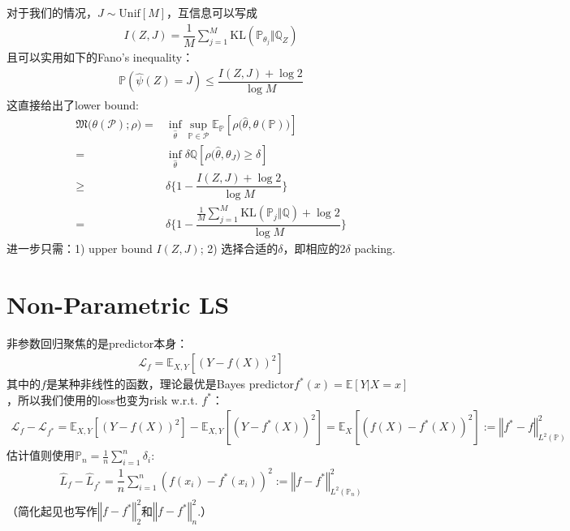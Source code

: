 \documentclass[11pt,a4paper]{ctexart}
\numberwithin{equation}{section}%
\begin{document}
对于我们的情况，$ J \sim \mathrm{ Unif }[M] $，互信息可以写成
\begin{align*}
    I(Z,J) = \dfrac{ 1 }{ M  } \sum_{j=1}^M \mathrm{ KL }\left( \mathbb{P}_{\theta _j}\Vert \mathbb{Q}_Z \right)
\end{align*}
且可以实用如下的Fano's inequality：
\begin{align*}
    \mathbb{P}\left( \hat{\psi}(Z) = J \right) \leq \dfrac{ I(Z,J)+ \log 2 }{ \log M }   
\end{align*}
这直接给出了lower bound:
\begin{align*}
    \mathfrak{M}\big(\theta (\mathcal{P});\rho \big)  = & \mathop{ \inf  }\limits_{\hat{\theta }} \mathop{ \sup  }\limits_{\mathbb{P}\in \mathcal{P}} \mathbb{E}_\mathbb{P}\left[ \rho \bigl(\hat{\theta }, \theta (\mathbb{P})\bigr) \right]   \\
    =& \mathop{ \inf  }\limits_{\hat{\theta }} \delta \mathbb{Q}[ \rho \bigl(\hat{\theta }, \theta_J \bigr) \geq \delta  ]\\
    \geq &\delta \big\{ 1-\dfrac{ I(Z,J)+ \log 2 }{ \log M }     \big\}\\
    =& \delta \big\{ 1-\dfrac{ \frac{1}{M} \sum_{j=1}^M \mathrm{ KL }(\mathbb{P}_j \Vert \mathbb{Q})  + \log 2 }{ \log M }     \big\}
\end{align*}
进一步只需：1) upper bound $ I(Z,J) $; 2) 选择合适的$ \delta  $，即相应的$ 2\delta  $ packing.








\section{Non-Parametric LS}
非参数回归聚焦的是predictor本身：
\begin{align*}
    \mathcal{L}_f= \mathbb{E}_{X,Y}\left[ (Y-f(X))^2 \right]  
\end{align*}
其中的$ f $是某种非线性的函数，理论最优是Bayes predictor$ f^*(x)=\mathbb{E}\left[ Y|X=x \right]  $，所以我们使用的loss也变为risk w.r.t. $ f^* $：
\begin{align*}
     \mathcal{L}_f-\mathcal{L}_{f^*} = \mathbb{E}_{X,Y}\left[ (Y-f(X))^2 \right] - \mathbb{E}_{X,Y}\left[ (Y-f^*(X))^2 \right] = \mathbb{E}_X\left[ (f(X)-f^*(X))^2 \right] := \left\Vert f^*-f \right\Vert^2_{L^2(\mathbb{P})} 
\end{align*}
估计值则使用$ \mathbb{P}_n = \frac{1}{n}\sum_{i=1}^n \delta _i $:
\begin{align*}
    \hat{L}_f-\hat{L}_{f^*}= \dfrac{ 1 }{ n }\sum_{i=1}^n \left(f(x_i)-f^*(x_i) \right)^2 := \left\Vert f-f^* \right\Vert ^2_{L^2(\mathbb{P}_n)}
\end{align*}
（简化起见也写作$ \left\Vert f-f^* \right\Vert^2_2  $和$ \left\Vert f-f^* \right\Vert^2_{n}  $.）
\end{document}

